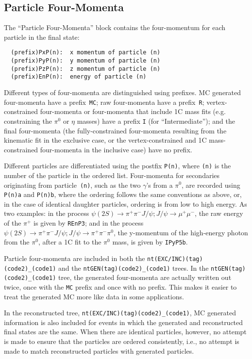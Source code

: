 \documentclass[11pt,a4paper]{define/cepcnote}
\begin{document}
\subsection{Particle Four-Momenta}
\label{sec:nt:momentum}

The ``Particle Four-Momenta'' block contains the four-momentum for each particle in the final state:

\begin{verbatim}
  (prefix)PxP(n):  x momentum of particle (n)
  (prefix)PyP(n):  y momentum of particle (n)
  (prefix)PzP(n):  z momentum of particle (n)
  (prefix)EnP(n):  energy of particle (n)
\end{verbatim}

Different types of four-momenta are distinguished using prefixes.  MC generated four-momenta have a prefix~{\tt MC}; raw four-momenta have a prefix~{\tt R}; vertex-constrained four-momenta or four-momenta that include 1C mass fits (e.g. constraining the $\pi^0$ or $\eta$ masses) have a prefix {\tt I} (for ``Intermediate''); and the final four-momenta (the fully-constrained four-momenta resulting from the kinematic fit in the exclusive case, or the vertex-constrained and 1C mass-constrained four-momenta in the inclusive case) have no prefix.

Different particles are differentiated using the postfix {\tt P(n)}, where {\tt (n)} is the number of the particle in the ordered list.  Four-momenta for secondaries originating from particle~{\tt (n)}, such as the two $\gamma$'s from a $\pi^0$, are recorded using {\tt P(n)a} and {\tt P(n)b}, where the ordering follows the same conventions as above, or, in the case of identical daughter particles, ordering is from low to high energy.  As two examples: in the process $\psi(2S)\to\pi^+\pi^-J/\psi; J/\psi\to\mu^+\mu^-$, the raw energy of the $\pi^+$ is given by {\tt REnP3}; and in the process $\psi(2S)\to\pi^+\pi^-J/\psi; J/\psi\to\pi^+\pi^-\pi^0$, the y-momentum of the high-energy photon from the $\pi^0$, after a 1C fit to the $\pi^0$ mass, is given by {\tt IPyP5b}.


Particle four-momenta are included in both the {\tt nt(EXC/INC)(tag)(code2)\_(code1)} and the {\tt ntGEN(tag)(code2)\_(code1)} trees.  In the {\tt ntGEN(tag)(code2)\_(code1)} tree, the generated four-momenta are actually written out twice, once with the {\tt MC} prefix and once with no prefix.  This makes it easier to treat the generated MC more like data in some applications.

In the reconstructed tree, {\tt nt(EXC/INC)(tag)(code2)\_(code1)}, MC generated information is also included for events in which the generated and reconstructed final states are the same.  When there are identical particles, however, no attempt is made to ensure that the particles are ordered consistently, i.e., no attempt is made to match reconstructed particles with generated particles.
\end{document}
